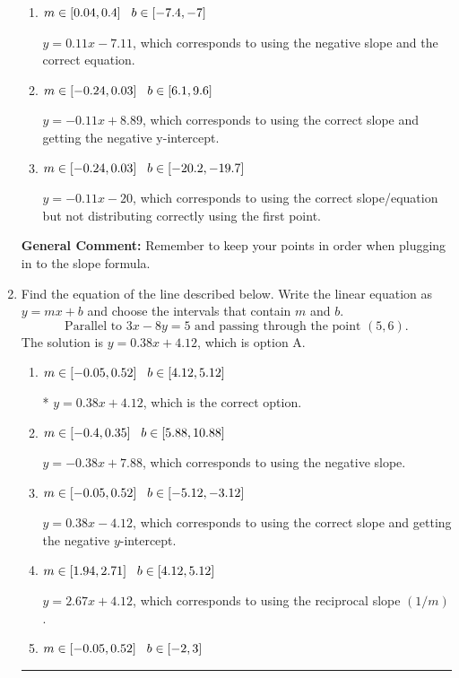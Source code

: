\documentclass{extbook}[14pt]
\newcommand{\litem}[1]{\item #1

\rule{\textwidth}{0.4pt}}
\begin{document}
\begin{enumerate}
{\begin{enumerate}[label=\Alph*.]
* $y = -0.11x -8.89$, which is the correct option.
\item \( m \in [0.04, 0.4] \hspace*{3mm} b \in [-7.4, -7] \)

 $y = 0.11x -7.11$, which corresponds to using the negative slope and the correct equation.
\item \( m \in [-0.24, 0.03] \hspace*{3mm} b \in [6.1, 9.6] \)

 $y = -0.11x + 8.89$, which corresponds to using the correct slope and getting the negative y-intercept.
\item \( m \in [-0.24, 0.03] \hspace*{3mm} b \in [-20.2, -19.7] \)

 $y = -0.11x -20$, which corresponds to using the correct slope/equation but not distributing correctly using the first point.
\end{enumerate}

\textbf{General Comment:} Remember to keep your points in order when plugging in to the slope formula.
}
\litem{
Find the equation of the line described below. Write the linear equation as $ y=mx+b $ and choose the intervals that contain $m$ and $b$.
\[ \text{Parallel to } 3 x - 8 y = 5 \text{ and passing through the point } (5, 6). \]
The solution is \( y = 0.38x + 4.12 \), which is option A.\begin{enumerate}[label=\Alph*.]
\item \( m \in [-0.05, 0.52] \hspace*{3mm} b \in [4.12, 5.12] \)

* $y = 0.38x + 4.12$, which is the correct option.
\item \( m \in [-0.4, 0.35] \hspace*{3mm} b \in [5.88, 10.88] \)

 $y = -0.38x + 7.88$, which corresponds to using the negative slope.
\item \( m \in [-0.05, 0.52] \hspace*{3mm} b \in [-5.12, -3.12] \)

 $y = 0.38x - 4.12$, which corresponds to using the correct slope and getting the negative $y$-intercept.
\item \( m \in [1.94, 2.71] \hspace*{3mm} b \in [4.12, 5.12] \)

 $y = 2.67x + 4.12$, which corresponds to using the reciprocal slope $(1/m)$.
\item \( m \in [-0.05, 0.52] \hspace*{3mm} b \in [-2, 3] \)


\end{enumerate}}
\end{enumerate}
\end{document}
